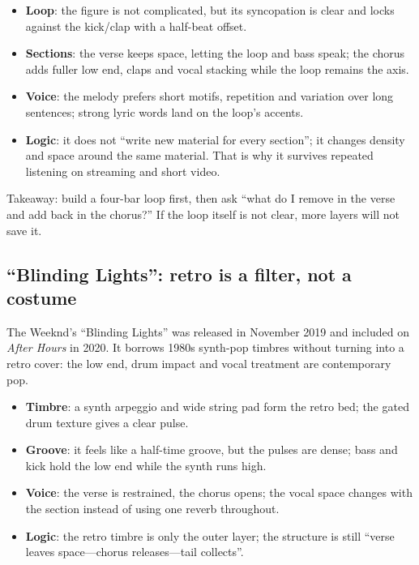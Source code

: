 \begin{itemize}
\item \textbf{Loop}: the figure is not complicated, but its syncopation is clear and locks against the kick/clap with a half-beat offset.
\item \textbf{Sections}: the verse keeps space, letting the loop and bass speak; the chorus adds fuller low end, claps and vocal stacking while the loop remains the axis.
\item \textbf{Voice}: the melody prefers short motifs, repetition and variation over long sentences; strong lyric words land on the loop's accents.
\item \textbf{Logic}: it does not ``write new material for every section''; it changes density and space around the same material. That is why it survives repeated listening on streaming and short video.
\end{itemize}

Takeaway: build a four-bar loop first, then ask ``what do I remove in the verse and add back in the chorus?'' If the loop itself is not clear, more layers will not save it.

\subsection{``Blinding Lights'': retro is a filter, not a costume}
\label{sec:pop-case-blinding-lights}

The Weeknd's ``Blinding Lights'' was released in November 2019 and included on \emph{After Hours} in 2020. It borrows 1980s synth-pop timbres without turning into a retro cover: the low end, drum impact and vocal treatment are contemporary pop.

\begin{itemize}
\item \textbf{Timbre}: a synth arpeggio and wide string pad form the retro bed; the gated drum texture gives a clear pulse.
\item \textbf{Groove}: it feels like a half-time groove, but the pulses are dense; bass and kick hold the low end while the synth runs high.
\item \textbf{Voice}: the verse is restrained, the chorus opens; the vocal space changes with the section instead of using one reverb throughout.
\item \textbf{Logic}: the retro timbre is only the outer layer; the structure is still ``verse leaves space---chorus releases---tail collects''.
\end{itemize}


